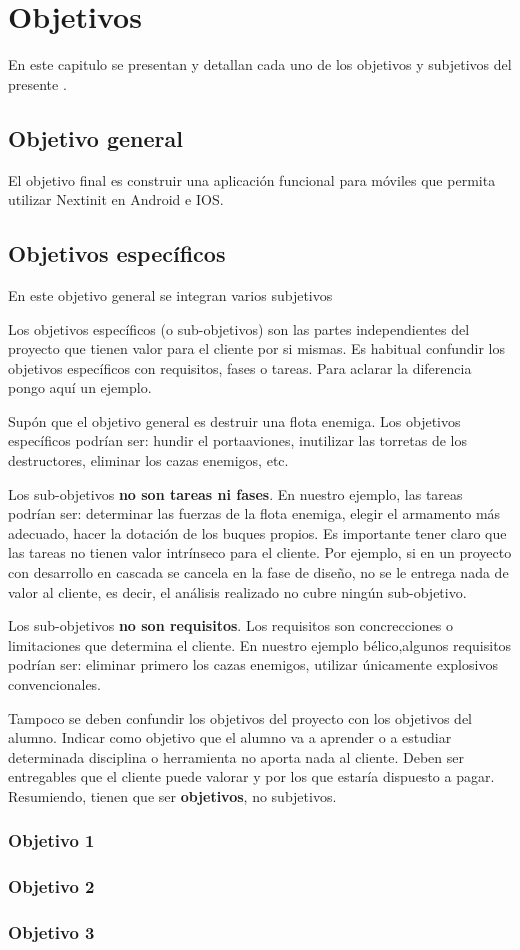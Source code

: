 \chapter{Objetivos}
\label{chap:objetivos}

En este capitulo se  presentan y detallan cada uno de los objetivos y subjetivos
del presente .
\section{Objetivo general}

El objetivo final es construir una aplicación funcional para móviles que permita
utilizar Nextinit en Android e IOS.


\section{Objetivos específicos}

En este objetivo general se integran varios subjetivos 



Los objetivos específicos (o sub-objetivos) son las partes independientes del
proyecto que tienen valor para el cliente por si mismas. Es habitual confundir
los objetivos específicos con requisitos, fases o tareas. Para aclarar la
diferencia pongo aquí un ejemplo.

Supón que el objetivo general es destruir una flota enemiga. Los
objetivos específicos podrían ser: hundir el portaaviones, inutilizar las
torretas de los destructores, eliminar los cazas enemigos, etc.

Los sub-objetivos \textbf{no son tareas ni fases}.  En nuestro ejemplo, las
tareas podrían ser: determinar las fuerzas de la flota enemiga, elegir el
armamento más adecuado, hacer la dotación de los buques propios. Es importante
tener claro que las tareas no tienen valor intrínseco para el cliente. Por
ejemplo, si en un proyecto con desarrollo en cascada se cancela en la fase de
diseño, no se le entrega nada de valor al cliente, es decir, el análisis
realizado no cubre ningún sub-objetivo.

Los sub-objetivos \textbf{no son requisitos}. Los requisitos son concrecciones o
limitaciones que determina el cliente. En nuestro ejemplo bélico,algunos
requisitos podrían ser: eliminar primero los cazas enemigos, utilizar únicamente
explosivos convencionales.

Tampoco se deben confundir los objetivos del proyecto con los objetivos del
alumno. Indicar como objetivo que el alumno va a aprender o a estudiar
determinada disciplina o herramienta no aporta nada al cliente. Deben ser
entregables que el cliente puede valorar y por los que estaría dispuesto a
pagar. Resumiendo, tienen que ser \textbf{objetivos}, no subjetivos.

\subsection{Objetivo 1}

\subsection{Objetivo 2}

\subsection{Objetivo 3}


